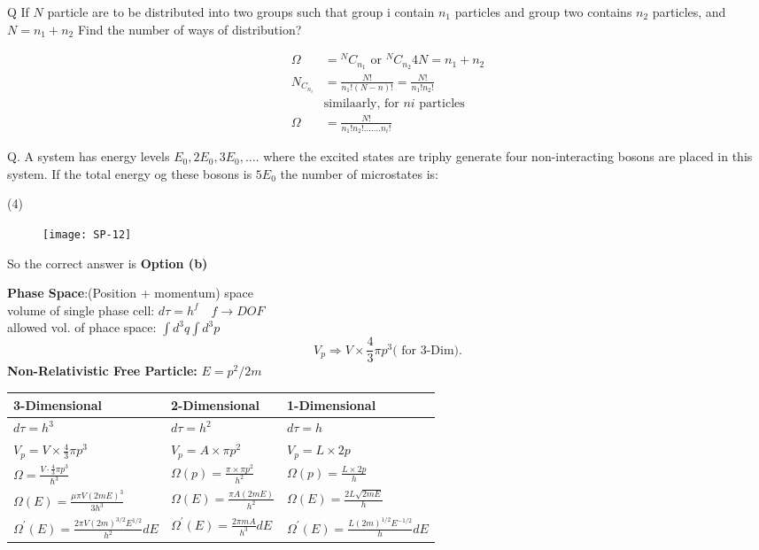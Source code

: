 Q If $N$ particle are to be distributed into two groups such that group i contain $n_1$ particles and group two contains $n_2$ particles, and $N=n_1+n_2$ Find the number of ways of distribution?
\begin{answer}
	\begin{align*}
	\Omega&={ }^{N} C_{n_{1}} \text { or }{ }^{N} C_{n_{2}} 4 N=n_{1}+n_{2}\\
	N_{C_{n_{i}}}&=\frac{N !}{n_{1} !(N-n) !}=\frac{N !}{n_{1} ! n_{2} !}\\
	&\text{similaarly, for $ni$ particles}\\
	\Omega&=\frac{N!}{n_1!n_2!.......n_i!}
	\end{align*}
\end{answer}
Q. A system has energy levels $E_{0}, 2 E_{0}, 3 E_{0}, \ldots .$ where the excited states are triphy generate four non-interacting bosons are placed in this system. If the total energy og these bosons is $5E_0$ the number of microstates is:
 \begin{tasks}(4)
\end{tasks}
\begin{answer}
	\begin{figure}[H]
		\centering
		\texttt{[image: SP-12]}
	\end{figure}
	So the correct answer is \textbf{Option (b)}
\end{answer}
\textbf{Phase Space}:(Position + momentum) space\\
volume of single phase cell: $d \tau=h^{f} \quad f \rightarrow D O F$\\
allowed vol. of phace space: $\int d^{3} q \int d^{3} p$\\
$$
V_{p} \Rightarrow V \times \frac{4}{3} \pi p^{3}\text{( for 3-Dim).}
$$
\textbf{Non-Relativistic Free Particle: }$E=p^2/2m$\\
\renewcommand*{\arraystretch}{2}
 \begin{tabular}{|p{4cm}|p{4cm}|p{4cm}|}
 	\hline
 3-Dimensional&2-Dimensional&1-Dimensional\\\hline
 $d \tau=h^{3}$&$d \tau=h^{2}$&$d \tau=h$\\\hline
 $V_{p}=V \times \frac{4}{3} \pi p^{3}$&$V_{p}=A \times \pi p^{2}$&$V_p=L\times2p$\\\hline
 $\Omega=\frac{V \cdot \frac{4}{3} \pi p^{3}}{\hbar^{3}}$&$\Omega(p)=\frac{\pi \times \pi p^{2}}{h^{2}}$&$\Omega(p)=\frac{L \times 2 p}{h}$\\\hline
 $\Omega(E)=\frac{\mu\pi V(2mE)^3}{3h^3}$&$\Omega(E)=\frac{\pi A(2mE)}{h^2}$&$\Omega(E)=\frac{2L\sqrt{2mE}}{h}$\\\hline
 $\Omega^{\prime}(E)=\frac{2 \pi V(2 m)^{3 / 2} E^{1 / 2}}{h^2}dE$&$\Omega^{\prime}(E)=\frac{2 \pi mA}{h^3}dE$&$\Omega^{\prime}(E)=\frac{L(2m)^{1/2}E^{-1/2}}{h}dE$\\\hline
 \end{tabular}
